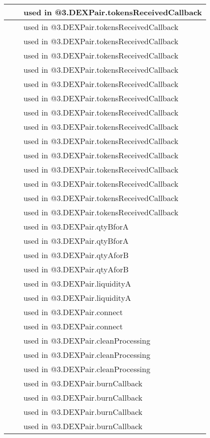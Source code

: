 \begin{tabular}{|l|l|p{5cm}|}
 & & used in @3.DEXPair.tokensReceivedCallback\\\hline
 & & used in @3.DEXPair.tokensReceivedCallback\\\hline
 & & used in @3.DEXPair.tokensReceivedCallback\\\hline
 & & used in @3.DEXPair.tokensReceivedCallback\\\hline
 & & used in @3.DEXPair.tokensReceivedCallback\\\hline
 & & used in @3.DEXPair.tokensReceivedCallback\\\hline
 & & used in @3.DEXPair.tokensReceivedCallback\\\hline
 & & used in @3.DEXPair.tokensReceivedCallback\\\hline
 & & used in @3.DEXPair.tokensReceivedCallback\\\hline
 & & used in @3.DEXPair.tokensReceivedCallback\\\hline
 & & used in @3.DEXPair.tokensReceivedCallback\\\hline
 & & used in @3.DEXPair.tokensReceivedCallback\\\hline
 & & used in @3.DEXPair.tokensReceivedCallback\\\hline
 & & used in @3.DEXPair.tokensReceivedCallback\\\hline
 & & used in @3.DEXPair.tokensReceivedCallback\\\hline
 & & used in @3.DEXPair.qtyBforA\\\hline
 & & used in @3.DEXPair.qtyBforA\\\hline
 & & used in @3.DEXPair.qtyAforB\\\hline
 & & used in @3.DEXPair.qtyAforB\\\hline
 & & used in @3.DEXPair.liquidityA\\\hline
 & & used in @3.DEXPair.liquidityA\\\hline
 & & used in @3.DEXPair.connect\\\hline
 & & used in @3.DEXPair.connect\\\hline
 & & used in @3.DEXPair.cleanProcessing\\\hline
 & & used in @3.DEXPair.cleanProcessing\\\hline
 & & used in @3.DEXPair.cleanProcessing\\\hline
 & & used in @3.DEXPair.burnCallback\\\hline
 & & used in @3.DEXPair.burnCallback\\\hline
 & & used in @3.DEXPair.burnCallback\\\hline
 & & used in @3.DEXPair.burnCallback\\\hline

\end{tabular}
